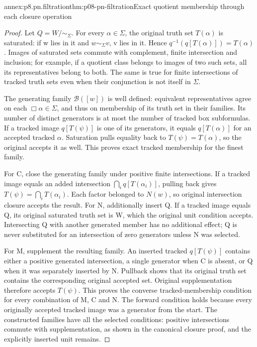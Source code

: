 \begin{annexitem}{annex:p8.pn.filtration}{thm:p08-pn-filtration}{Exact quotient membership through each closure operation}
\begin{proof}
Let \(Q=W/{\sim_\Sigma}\). For every \(\alpha\in\Sigma\),
the original truth set \(T(\alpha)\) is saturated: if w lies
in it and \(w\sim_\Sigma v\), v lies in it. Hence
\(q^{-1}(q[T(\alpha)])=T(\alpha)\). Images of saturated
sets commute with complement, finite intersection and inclusion;
for example, if a quotient class belongs to images of two such
sets, all its representatives belong to both. The same is true
for finite intersections of tracked truth sets even when their
conjunction is not itself in \(\Sigma\).

The generating family \(\mathcal B([w])\) is well defined:
equivalent representatives agree on each \(\Box\alpha\in\Sigma\),
and thus on membership of its truth set in their families. Its
number of distinct generators is at most the number of tracked
box subformulas. If a tracked image \(q[T(\psi)]\) is one
of its generators, it equals \(q[T(\alpha)]\) for an accepted
tracked \(\alpha\). Saturation pulls equality back to
\(T(\psi)=T(\alpha)\), so the original accepts it as well.
This proves exact tracked membership for the finest family.

For C, close the generating family under positive finite intersections.
If a tracked image equals an added intersection
\(\bigcap_i q[T(\alpha_i)]\), pulling back gives
\(T(\psi)=\bigcap_i T(\alpha_i)\). Each factor belonged
to \(N(w)\), so original intersection closure accepts the result.
For N, additionally insert Q. If a tracked image equals Q,
its original saturated truth set is W, which the original unit
condition accepts. Intersecting Q with another generated member
has no additional effect; Q is never substituted for an intersection
of zero generators unless N was selected.

For M, supplement the resulting family. An inserted tracked
\(q[T(\psi)]\) contains either a positive generated
intersection, a single generator when C is absent, or Q when
it was separately inserted by N. Pullback shows that its original
truth set contains the corresponding original accepted set.
Original supplementation therefore accepts \(T(\psi)\).
This proves the converse tracked-membership condition for every
combination of M, C and N. The forward condition holds because
every originally accepted tracked image was a generator from the
start. The constructed families have all the selected conditions:
positive intersections commute with supplementation, as shown in
the canonical closure proof, and the explicitly inserted unit remains.


\end{proof}
\end{annexitem}
